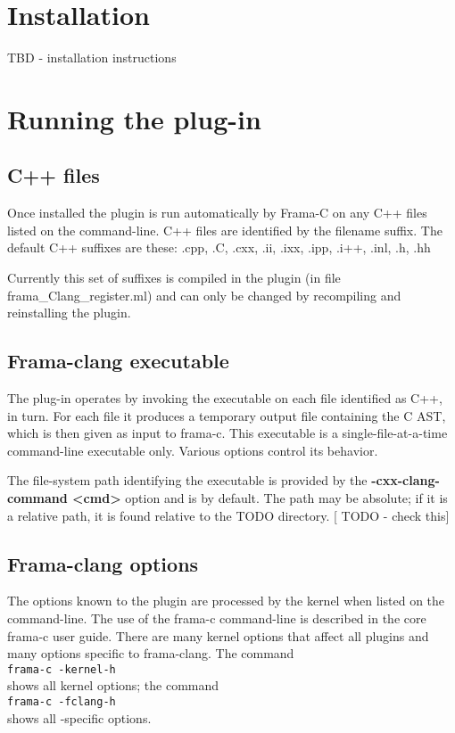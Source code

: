 
\chapter{Installation}

TBD - installation instructions

\chapter{Running the plug-in}

\section{C++ files}
Once installed the plugin is run automatically by Frama-C on any C++ files listed on the command-line. C++ files are identified by the filename suffix. The default C++ suffixes are these:
 .cpp, .C, .cxx, .ii, .ixx, .ipp, .i++, .inl, .h, .hh

Currently this set of suffixes is compiled in the plugin (in file frama\_Clang\_register.ml) and can only be changed by recompiling and
reinstalling the plugin.

\section{Frama-clang executable}
The plug-in operates by invoking the executable \irg
on each file identified as C++, in turn. 
For each file it produces a temporary output file containing the C AST, which is then given as input to frama-c. This executable is a single-file-at-a-time command-line executable only. 
Various options control its behavior.

The file-system path identifying the executable is provided by the \textbf{-cxx-clang-command <cmd>}
option and is \irg by default. The path may be absolute; if it is a relative path, it is found relative to the TODO directory. [ TODO - check this]


\section{Frama-clang options}

The options known to the \fcl plugin are processed by the \fc kernel when listed on the \fc command-line. 
The use of the frama-c command-line is described in the core frama-c 
user guide.
There are many kernel options that affect all plugins and many options specific to frama-clang.
The command \\
\lstinline|frama-c -kernel-h| \\
shows all kernel options; the command\\
\lstinline|frama-c -fclang-h| \\
shows all \fcl-specific options.

